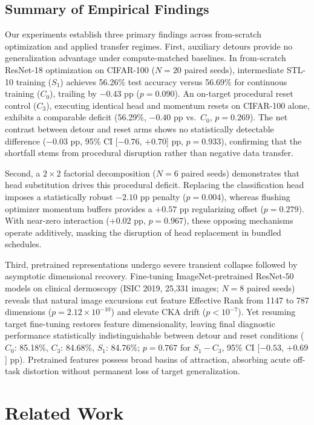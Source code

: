 \documentclass[10pt]{article}
\begin{document}
\subsection{Summary of Empirical Findings}\label{subsec:intro_contributions}

Our experiments establish three primary findings across from-scratch optimization and applied transfer regimes. First, auxiliary detours provide no generalization advantage under compute-matched baselines. In from-scratch ResNet-18 optimization on CIFAR-100 ($N = 20$ paired seeds), intermediate STL-10 training ($S_1$) achieves 56.26\% test accuracy versus 56.69\% for continuous training ($C_0$), trailing by $-0.43$ pp ($p = 0.090$). An on-target procedural reset control ($C_3$), executing identical head and momentum resets on CIFAR-100 alone, exhibits a comparable deficit (56.29\%, $-0.40$ pp vs.\ $C_0$, $p = 0.269$). The net contrast between detour and reset arms shows no statistically detectable difference ($-0.03$ pp, 95\% CI [$-0.76$, $+0.70$] pp, $p = 0.933$), confirming that the shortfall stems from procedural disruption rather than negative data transfer.

Second, a $2 \times 2$ factorial decomposition ($N = 6$ paired seeds) demonstrates that head substitution drives this procedural deficit. Replacing the classification head imposes a statistically robust $-2.10$ pp penalty ($p = 0.004$), whereas flushing optimizer momentum buffers provides a $+0.57$ pp regularizing offset ($p = 0.279$). With near-zero interaction ($+0.02$ pp, $p = 0.967$), these opposing mechanisms operate additively, masking the disruption of head replacement in bundled schedules.

Third, pretrained representations undergo severe transient collapse followed by asymptotic dimensional recovery. Fine-tuning ImageNet-pretrained ResNet-50 models on clinical dermoscopy (ISIC 2019, 25,331 images; $N = 8$ paired seeds) reveals that natural image excursions cut feature Effective Rank from 1147 to 787 dimensions ($p = 2.12 \times 10^{-10}$) and elevate CKA drift ($p < 10^{-7}$). Yet resuming target fine-tuning restores feature dimensionality, leaving final diagnostic performance statistically indistinguishable between detour and reset conditions ($C_0$: 85.18\%, $C_3$: 84.68\%, $S_1$: 84.76\%; $p = 0.767$ for $S_1 - C_3$, 95\% CI [$-0.53$, $+0.69$] pp). Pretrained features possess broad basins of attraction, absorbing acute off-task distortion without permanent loss of target generalization.

\section{Related Work}\label{sec:related_work}
\end{document}
